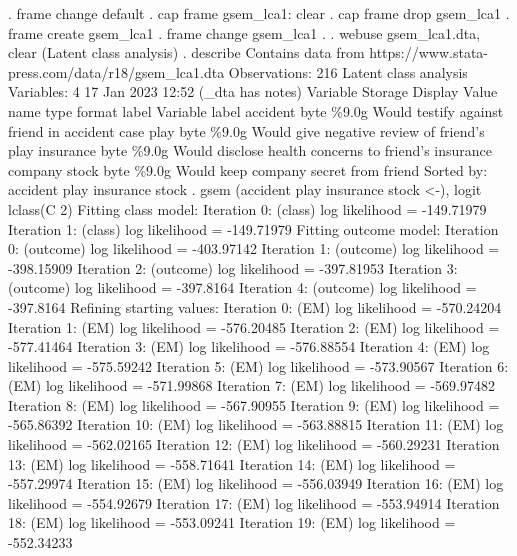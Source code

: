 . frame change default
{\smallskip}
. cap frame gsem_lca1: clear
{\smallskip}
. cap frame drop gsem_lca1 
{\smallskip}
. frame create gsem_lca1
{\smallskip}
. frame change gsem_lca1
{\smallskip}
. 
. webuse gsem_lca1.dta, clear
(Latent class analysis)
{\smallskip}
. describe
{\smallskip}
Contains data from https://www.stata-press.com/data/r18/gsem_lca1.dta
 Observations:           216                  Latent class analysis
    Variables:             4                  17 Jan 2023 12:52
                                              (_dta has notes)
Variable      Storage   Display    Value
    name         type    format    label      Variable label
accident        byte    \%9.0g                 Would testify against friend in accident case
play            byte    \%9.0g                 Would give negative review of friend's play
insurance       byte    \%9.0g                 Would disclose health concerns to friend's insurance company
stock           byte    \%9.0g                 Would keep company secret from friend
Sorted by: accident  play  insurance  stock
{\smallskip}
. gsem (accident play insurance stock <-), logit lclass(C 2)
{\smallskip}
Fitting class model:
{\smallskip}
Iteration 0:  (class) log likelihood = -149.71979  
Iteration 1:  (class) log likelihood = -149.71979  
{\smallskip}
Fitting outcome model:
{\smallskip}
Iteration 0:  (outcome) log likelihood = -403.97142  
Iteration 1:  (outcome) log likelihood = -398.15909  
Iteration 2:  (outcome) log likelihood = -397.81953  
Iteration 3:  (outcome) log likelihood =  -397.8164  
Iteration 4:  (outcome) log likelihood =  -397.8164  
{\smallskip}
Refining starting values:
{\smallskip}
Iteration 0:  (EM) log likelihood = -570.24204
Iteration 1:  (EM) log likelihood = -576.20485
Iteration 2:  (EM) log likelihood = -577.41464
Iteration 3:  (EM) log likelihood = -576.88554
Iteration 4:  (EM) log likelihood = -575.59242
Iteration 5:  (EM) log likelihood = -573.90567
Iteration 6:  (EM) log likelihood = -571.99868
Iteration 7:  (EM) log likelihood = -569.97482
Iteration 8:  (EM) log likelihood = -567.90955
Iteration 9:  (EM) log likelihood = -565.86392
Iteration 10: (EM) log likelihood = -563.88815
Iteration 11: (EM) log likelihood = -562.02165
Iteration 12: (EM) log likelihood = -560.29231
Iteration 13: (EM) log likelihood = -558.71641
Iteration 14: (EM) log likelihood = -557.29974
Iteration 15: (EM) log likelihood = -556.03949
Iteration 16: (EM) log likelihood = -554.92679
Iteration 17: (EM) log likelihood = -553.94914
Iteration 18: (EM) log likelihood = -553.09241
Iteration 19: (EM) log likelihood = -552.34233
